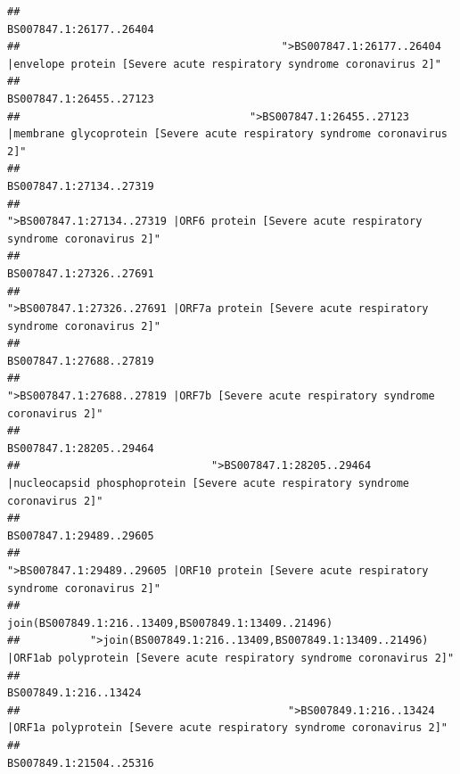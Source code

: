 \documentclass[
]{article}
\begin{document}
\begin{verbatim}
##                                                                                                                BS007847.1:26177..26404 
##                                         ">BS007847.1:26177..26404 |envelope protein [Severe acute respiratory syndrome coronavirus 2]" 
##                                                                                                                BS007847.1:26455..27123 
##                                    ">BS007847.1:26455..27123 |membrane glycoprotein [Severe acute respiratory syndrome coronavirus 2]" 
##                                                                                                                BS007847.1:27134..27319 
##                                             ">BS007847.1:27134..27319 |ORF6 protein [Severe acute respiratory syndrome coronavirus 2]" 
##                                                                                                                BS007847.1:27326..27691 
##                                            ">BS007847.1:27326..27691 |ORF7a protein [Severe acute respiratory syndrome coronavirus 2]" 
##                                                                                                                BS007847.1:27688..27819 
##                                                    ">BS007847.1:27688..27819 |ORF7b [Severe acute respiratory syndrome coronavirus 2]" 
##                                                                                                                BS007847.1:28205..29464 
##                              ">BS007847.1:28205..29464 |nucleocapsid phosphoprotein [Severe acute respiratory syndrome coronavirus 2]" 
##                                                                                                                BS007847.1:29489..29605 
##                                            ">BS007847.1:29489..29605 |ORF10 protein [Severe acute respiratory syndrome coronavirus 2]" 
##                                                                                    join(BS007849.1:216..13409,BS007849.1:13409..21496) 
##           ">join(BS007849.1:216..13409,BS007849.1:13409..21496) |ORF1ab polyprotein [Severe acute respiratory syndrome coronavirus 2]" 
##                                                                                                                  BS007849.1:216..13424 
##                                          ">BS007849.1:216..13424 |ORF1a polyprotein [Severe acute respiratory syndrome coronavirus 2]" 
##                                                                                                                BS007849.1:21504..25316 

\end{verbatim}
\end{document}
